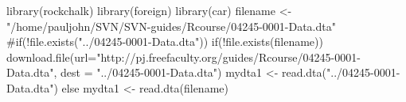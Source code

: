 \begin{Schunk}
\begin{Sinput}
 library(rockchalk)
 library(foreign)
 library(car)
 filename <- "/home/pauljohn/SVN/SVN-guides/Rcourse/04245-0001-Data.dta"
 #if(!file.exists("../04245-0001-Data.dta"))
 if(!file.exists(filename)){
    download.file(url="http://pj.freefaculty.org/guides/Rcourse/04245-0001-Data.dta", dest = "../04245-0001-Data.dta")
  mydta1 <- read.dta("../04245-0001-Data.dta")
  } else {
  mydta1 <- read.dta(filename)
  }
\end{Sinput}
\end{Schunk}
